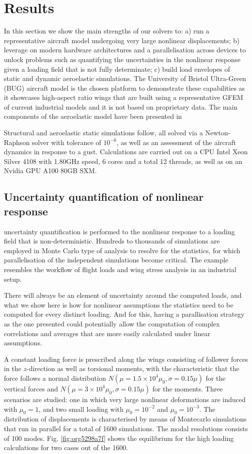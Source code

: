 \documentclass[11pt]{article}
\begin{document}
\section{Results}
\label{sec:org0a86af3}
In this section we show the main strengths of our solvers to: a) run a representative aircraft model undergoing very large nonlinear displacements; b) leverage on modern hardware architectures and a parallelisation across devices to unlock problems such as quantifying the uncertainties in the nonlinear response given a loading field that is not fully determinate; c) build load envelopes of static and dynamic aeroelastic simulations.
The University of Bristol Ultra-Green (BUG) aircraft model \cite{STODIECK2018} is the chosen platform to demonstrate these capabilities as it showcases high-aspect ratio wings that are built using a representative GFEM of current industrial models and it is not based on proprietary data. The main components of the aeroelastic model have been presented in 

Structural and aeroelastic static simulations follow, all solved via a Newton-Raphson solver with tolerance of \(10^{-6}\), as well as an assessment of the aircraft dynamics in response to a gust. 
Calculations are carried out on a CPU Intel Xeon Silver 4108 with 1.80GHz speed, 6 cores and a total 12 threads, as well as on an Nvidia GPU A100 80GB SXM. 
\subsection{Uncertainty quantification of nonlinear response}
\label{sec:orge1d2b8c}
uncertainty quantification is performed to the nonlinear response to a loading field that is non-deterministic. Hundreds to thousands of simulations are employed in Monte Carlo type of analysis to resolve for the statistics, for which parallelisation of the independent simulations become critical.
The example resembles the workflow of flight loads and wing stress analysis in an industrial setup.

There will always be an element of uncertainty around the computed loads, and what we show here is how for nonlinear assumptions the statistics need to be computed for every distinct loading. And for this, having a parallisation strategy as the one presented could potentially allow the computation of complex correlations and averages that are more easily calculated under linear assumptions. 

A constant loading force is prescribed along the wings consisting of follower forces in the \(z\)-direction as well as torsional moments, with the characteristic that the force follows a normal distribution \(N(\mu=1.5 \times 10^4 \mu_0, \sigma=0.15 \mu)\) for the vertical forces and \(N(\mu=3 \times 10^4 \mu_0, \sigma=0.15 \mu)\) for the moments. Three scenarios are studied: one in which very large nonlinear deformations are induced with \(\mu_0 = 1\), and two small loading with  \(\mu_0 = 10^{-2}\) and \(\mu_0 = 10^{-3}\).
The distribution of displacements is characterised by means of Montecarlo simulations that run in parallel for a total of 1600 simulations. The modal resolutions consists of 100 modes.
Fig. \ref{fig:org5298a7f} shows the equilibrium for the high loading calculations for two cases out of the 1600. 
\end{document}
